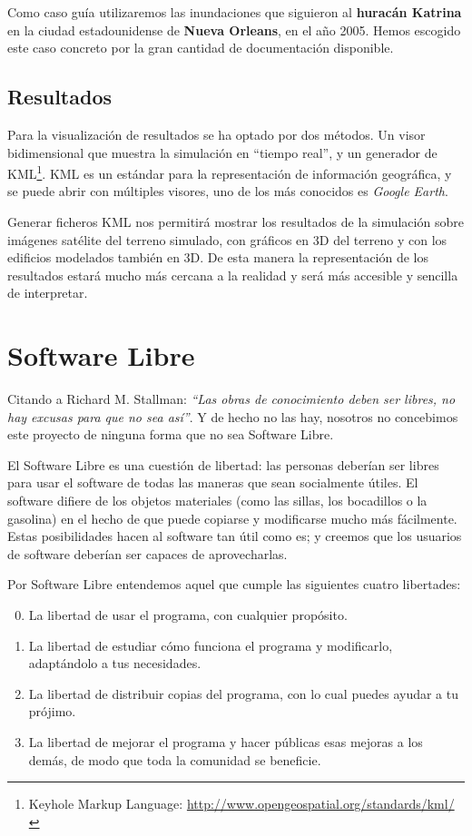 Como caso guía utilizaremos las inundaciones que siguieron al {\bf huracán
Katrina} en la ciudad estadounidense de {\bf Nueva Orleans}, en el año 2005.
Hemos escogido este caso concreto por la gran cantidad de documentación
disponible.

\subsection*{Resultados}

Para la visualización de resultados se ha optado por dos métodos. Un visor
bidimensional que muestra la simulación en ``tiempo real'', y un generador de
KML\footnote{Keyhole Markup Language:
\url{http://www.opengeospatial.org/standards/kml/}}. KML es un estándar para la
representación de información geográfica, y se puede abrir con múltiples
visores, uno de los más conocidos es {\em Google Earth}.

Generar ficheros KML nos permitirá mostrar los resultados de la simulación
sobre imágenes satélite del terreno simulado, con gráficos en 3D del terreno y
con los edificios modelados también en 3D. De esta manera la representación de
los resultados estará mucho más cercana a la realidad y será más accesible y
sencilla de interpretar.

\section*{Software Libre}

Citando a Richard M. Stallman: {\em ``Las obras de conocimiento deben ser
libres, no hay excusas para que no sea así''}. Y de hecho no las hay, nosotros
no concebimos este proyecto de ninguna forma que no sea Software Libre.

El Software Libre es una cuestión de libertad: las personas deberían ser libres
para usar el software de todas las maneras que sean socialmente útiles. El
software difiere de los objetos materiales (como las sillas, los bocadillos o la
gasolina) en el hecho de que puede copiarse y modificarse mucho más fácilmente.
Estas posibilidades hacen al software tan útil como es; y creemos que los
usuarios de software deberían ser capaces de aprovecharlas.

Por Software Libre entendemos aquel que cumple las siguientes cuatro libertades:

\begin{enumerate}
\setcounter{enumi}{-1}
\item La libertad de usar el programa, con cualquier propósito.
\item La libertad de estudiar cómo funciona el programa y modificarlo,
adaptándolo a tus necesidades.
\item La libertad de distribuir copias del programa, con lo cual puedes ayudar a
tu prójimo.
\item La libertad de mejorar el programa y hacer públicas esas mejoras a los
demás, de modo que toda la comunidad se beneficie.
\end{enumerate}

